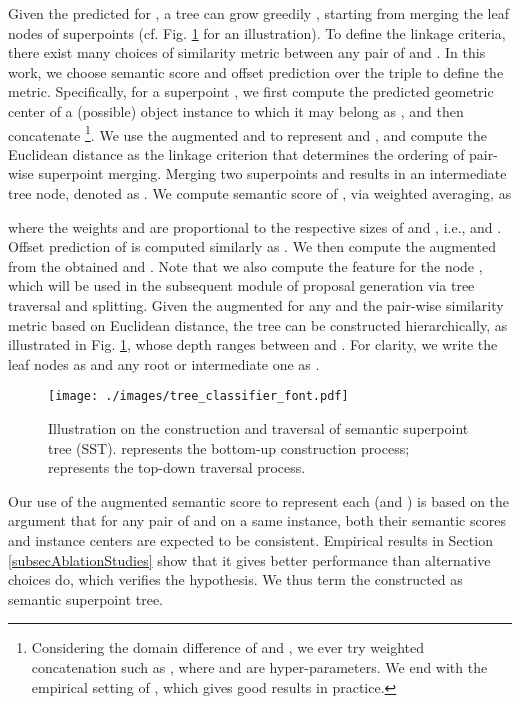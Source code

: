 \documentclass[10pt,twocolumn,letterpaper]{article}
\begin{document}
Given the predicted  for , a tree can grow greedily \cite{mullner2011modern}, starting from merging the leaf nodes of superpoints (cf. Fig. \ref{figTree} for an illustration). To define the linkage criteria, there exist many choices of similarity metric between any pair of  and . In this work, we choose semantic score and offset prediction over the triple  to define the metric. Specifically, for a superpoint , we first compute the predicted geometric center of a (possible) object instance to which it may belong as , and then concatenate  \footnote{Considering the domain difference of  and , we ever try weighted concatenation such as , where  and  are hyper-parameters. We end with the empirical setting of , which gives good results in practice. }. We use the augmented  and  to represent  and , and compute the Euclidean distance  as the linkage criterion that determines the ordering of pair-wise superpoint merging. Merging two superpoints  and  results in an intermediate tree node, denoted as . We compute semantic score of , via weighted averaging, as
\vspace{-0.2cm}

where the weights  and  are proportional to the respective sizes of  and , i.e.,  and . Offset prediction of  is computed similarly as . We then compute the augmented  from the obtained  and . Note that we also compute the feature  for the node , which will be used in the subsequent module of proposal generation via tree traversal and splitting. Given the augmented  for any  and the pair-wise similarity metric based on Euclidean distance, the tree can be constructed hierarchically, as illustrated in Fig. \ref{figTree}, whose depth ranges between  and . For clarity, we write the  leaf nodes as  and any root or intermediate one as .

\begin{figure}[htbp]
    \centering
    \texttt{[image: ./images/tree\_classifier\_font.pdf]}
    \caption{Illustration on the construction and traversal of semantic superpoint tree (SST). {\color{purple}{}} represents the bottom-up construction process; {\color{red}{}} represents the top-down traversal process.}
    \label{figTree}
\end{figure}

Our use of the augmented semantic score  to represent each  (and ) is based on the argument that for any pair of  and  on a same instance, both their semantic scores and instance centers are expected to be consistent. Empirical results in Section \ref{subsecAblationStudies} show that it gives better performance than alternative choices do, which verifies the hypothesis. We thus term the constructed  as semantic superpoint tree.
\end{document}
